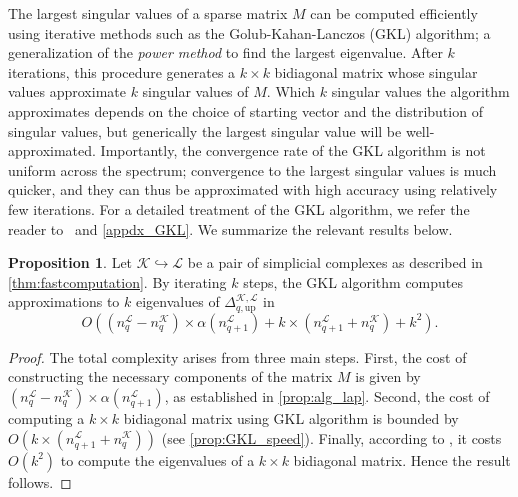 \documentclass{article}
\theoremstyle{definition}
\newtheorem{proposition}[theorem]{Proposition}
\newcommand{\KK}{\mathcal{K}}
\newcommand{\LL}{\mathcal{L}}
\begin{document}
The largest singular values of a sparse matrix $M$ can be computed efficiently using iterative methods such as the Golub-Kahan-Lanczos (GKL) algorithm; a generalization of the \emph{power method} to find the largest eigenvalue. After $k$ iterations, this procedure generates a $k \times k$ bidiagonal matrix whose singular values approximate $k$ singular values of $M$. Which $k$ singular values the algorithm approximates depends on the choice of starting vector and the distribution of singular values, but generically the largest singular value will be well-approximated. Importantly, the convergence rate of the GKL algorithm is not uniform across the spectrum; convergence to the largest singular values is much quicker, and they can thus be approximated with high accuracy using relatively few iterations. For a detailed treatment of the GKL algorithm, we refer the reader to~\cite{MR3024913, MR1792141} and \cref{appdx_GKL}. We summarize the relevant results below.

\begin{proposition}\label{prop:gkl}
Let $\KK\hookrightarrow \LL$ be a pair of simplicial complexes as described in \cref{thm:fastcomputation}. 
By iterating $k$ steps,
the GKL algorithm computes approximations to $k$ eigenvalues of $\Delta_{q, \text{up}}^{\KK, \LL}$ in 
\[
O\left((n_q^\LL-n_q^\KK)\times \alpha(n_{q+1}^\LL)+k\times (n_{q+1}^\LL+n_q^\KK)+k^2\right).
\]
\end{proposition}
\begin{proof}
The total complexity arises from three main steps. First, the cost of constructing the necessary components of the matrix $M$ is given by $(n_q^\LL-n_q^\KK)\times \alpha(n_{q+1}^\LL)$, as established in \cref{prop:alg_lap}. Second, the cost of computing a $k\times k$ bidiagonal matrix using GKL algorithm is bounded by $O(k\times (n_{q+1}^\LL+n_q^\KK))$ (see \cref{prop:GKL_speed}).
Finally,
according to \cite[Section 6.2]{MR1792141},
it costs $O(k^2)$ to compute the eigenvalues of a $k\times k$ bidiagonal matrix.
Hence the result follows.
\end{proof}
\end{document}
